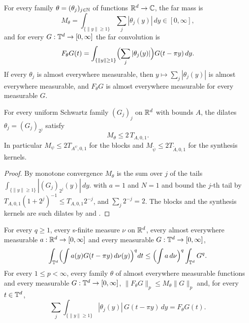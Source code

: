\begin{definition}
\label{def:torus-far-mass}
\leanok
{}
For every family $\theta = (\theta_j)_{j \in \mathbb{N}}$ of functions $\mathbb{R}^d \to \mathbb{C}$, the far mass is
\[
  M_\theta = \int_{\{\|y\| \geq 1\}} \sum_j |\theta_j(y)| \, dy \in [0, \infty],
\]
and for every $G : \mathbb{T}^d \to [0, \infty]$ the far convolution is
\[
  F_\theta G(t) = \int_{\{\|y\| \geq 1\}} \Bigl( \sum_j |\theta_j(y)| \Bigr) G(t - \pi y) \, dy .
\]
If every $\theta_j$ is almost everywhere measurable, then $y \mapsto \sum_j |\theta_j(y)|$ is
almost everywhere measurable, and $F_\theta G$ is almost everywhere measurable for every
measurable $G$.
\end{definition}

\begin{lemma}
\label{lem:torus-far-mass-dilate}
\leanok
{}
For every uniform Schwartz family $(G_j)_j$ on $\mathbb{R}^d$ with bounds $A$, the dilates
$\theta_j = (G_j)_{2^j}$ satisfy
\[
  M_\theta \leq 2 \, T_{A,0,1} .
\]
In particular $M_\psi \leq 2 T_{A^\psi,0,1}$ for the blocks and
$M_{\tilde\psi} \leq 2 T_{\tilde A,0,1}$ for the synthesis kernels.
\end{lemma}

\begin{proof}
\leanok
By monotone convergence $M_\theta$ is the sum over $j$ of the tails
$\int_{\{\|y\| \geq 1\}} |(G_j)_{2^j}(y)| \, dy$.  with $a = 1$ and
$N = 1$ and  bound the $j$-th tail by
$T_{A,0,1} (1 + 2^j)^{-1} \leq T_{A,0,1} 2^{-j}$, and $\sum_j 2^{-j} = 2$. The blocks and the
synthesis kernels are such dilates by  and .
\end{proof}

\begin{lemma}
\label{lem:torus-far-conv-young}
\leanok
{}
For every $q \geq 1$, every s-finite measure $\nu$ on $\mathbb{R}^d$, every almost everywhere measurable
$a : \mathbb{R}^d \to [0, \infty]$ and every measurable $G : \mathbb{T}^d \to [0, \infty]$,
\[
  \int_{\mathbb{T}^d} \Bigl( \int a(y) G(t - \pi y) \, d\nu(y) \Bigr)^q dt
  \leq \Bigl( \int a \, d\nu \Bigr)^q \int_{\mathbb{T}^d} G^q .
\]
For every $1 \leq p < \infty$, every family $\theta$ of almost everywhere measurable functions and
every measurable $G : \mathbb{T}^d \to [0, \infty]$, $\|F_\theta G\|_p \leq M_\theta \|G\|_p$ and, for
every $t \in \mathbb{T}^d$,
\[
  \sum_j \int_{\{\|y\| \geq 1\}} |\theta_j(y)| \, G(t - \pi y) \, dy = F_\theta G(t) .
\]
\end{lemma}

